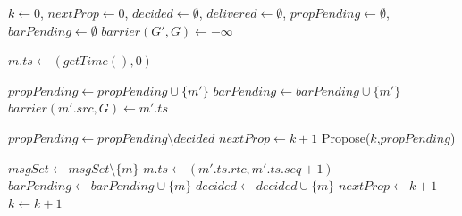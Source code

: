\documentclass[times, 10pt]{article}
\begin{document}
\begin{algorithm}
\begin{distribalgo}[1]

\blankline
{}
  \STATE $k \leftarrow 0$, $nextProp \leftarrow 0$, $decided \leftarrow \emptyset$, $delivered \leftarrow \emptyset$, $propPending \leftarrow \emptyset$, $barPending \leftarrow \emptyset$
    \STATE $barrier(G',G) \leftarrow -\infty$ 
  \ENDINDENT
\ENDINDENT 

\blankline
{}
  \STATE $m.ts \leftarrow (getTime(),0)$
  \STATE {}
\ENDINDENT

\blankline
{}
    \STATE $propPending \leftarrow propPending \cup \{m'\}$
    \STATE $barPending \leftarrow barPending \cup \{m'\}$  
    \STATE $barrier(m'.src,G) \leftarrow m'.ts$ \label{algline:incbar}
  \ENDIF
\ENDINDENT

\blankline
{}
    \STATE $propPending \leftarrow propPending \setminus decided$%
    \label{algline:nullstays}
      \STATE $nextProp \leftarrow k + 1$
      \STATE Propose($k$,$propPending$)
    \ENDIF
\ENDINDENT

\blankline
{}
    \STATE $msgSet \leftarrow msgSet \setminus \{m\}$
      \STATE $m.ts \leftarrow (m'.ts.rtc, m'.ts.seq + 1)$
    \ENDIF     
     \label{algline:checkcons}
      \STATE $barPending \leftarrow barPending \cup \{m\}$
    \ENDIF
    \STATE $decided \leftarrow decided \cup \{m\}$  
    \STATE {} 
  \ENDINDENT
  \STATE $nextProp \leftarrow k + 1$
  \STATE $k \leftarrow k + 1$
\ENDINDENT


\end{distribalgo}
\end{algorithm}
\end{document}
